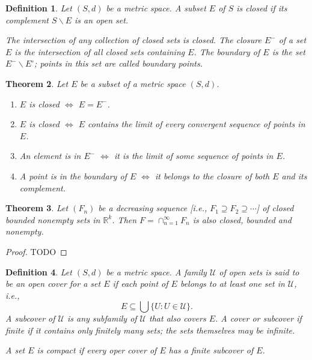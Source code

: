 \documentclass[12pt, lettersize]{book}
\newtheorem{thm}{Theorem}[section]
\newtheorem{dfn}[thm]{Definition}
\begin{document}
		\begin{dfn}
		Let $(S,d)$ be a metric space. A subset $E$ of $S$ is \emph{closed} if its complement $S\backslash E$ is an open set.
		
		The intersection of any collection of closed sets is closed. The \emph{closure} $E^-$ of a set $E$ is the intersection of all closed sets containing $E$.
		The \emph{boundary} of $E$ is the set $E^-\backslash E^\circ$; points in this set are called \emph{boundary points}.
		\end{dfn}
		\begin{thm}
			Let $E$ be a subset of a metric space $(S,d)$.
			\begin{enumerate}
				\item $E$ is closed $\iff$ $E=E^-$.
				\item $E$ is closed $\iff$ $E$ contains the limit of every convergent sequence of points in $E$.
				\item An element is in $E^-$ $\iff$ it is the limit of some sequence of points in $E$.
				\item A point is in the boundary of $E$ $\iff$ it belongs to the closure of both $E$ and its complement.
			\end{enumerate}
		\end{thm}
		
		\begin{thm}
		Let $(F_n)$ be a decreasing sequence [i.e., $F_1\supseteq F_2\supseteq\cdots$] of closed bounded nonempty sets in $\mathbb{R}^k$. Then $F=\cap_{n=1}^\infty F_n$ is also closed, bounded and nonempty.
		\end{thm}
		\begin{proof}
			TODO
		\end{proof}
	
		\begin{dfn}
		Let $(S,d)$ be a metric space. A family $\mathcal{U}$ of open sets is said to be an \emph{open cover} for a set
		$E$ if each point of $E$ belongs to at least one set in $\mathcal{U}$, i.e.,
		\begin{displaymath}
			E\subseteq\bigcup\{U:U\in\mathcal{U}\}.
		\end{displaymath}
		A \emph{subcover} of $\mathcal{U}$ is any subfamily of $\mathcal{U}$ that also covers $E$. A cover or subcover
		if \emph{finite} if it contains only finitely many sets; the sets themselves may be infinite.
		
		A set $E$ is \emph{compact} if every oper cover of $E$ has a finite subcover of $E$.
		\end{dfn}
		
\end{document}
